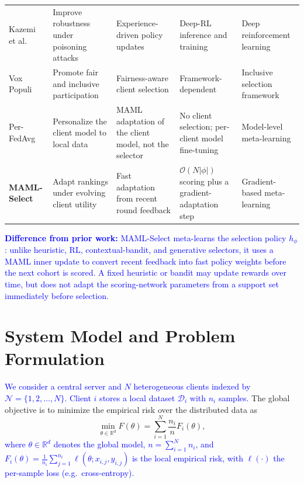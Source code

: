 \documentclass[journal]{IEEEtran}
\newcommand{\revision}[1]{\textcolor{blue}{#1}}
\begin{document}
\begin{table}[!t]
\begin{tabularx}{\textwidth}{lXXXX}
        Kazemi et al.~\cite{kazemi2026robust} & Improve robustness under poisoning attacks & Experience-driven policy updates & Deep-RL inference and training & Deep reinforcement learning \\
        Vox Populi~\cite{arisdakessian2026vox} & Promote fair and inclusive participation & Fairness-aware client selection & Framework-dependent & Inclusive selection framework \\
        Per-FedAvg~\cite{fallah2020personalized} & Personalize the client model to local data & MAML adaptation of the client model, not the selector & No client selection; per-client model fine-tuning & Model-level meta-learning \\
        \textbf{MAML-Select} & Adapt rankings under evolving client utility & Fast adaptation from recent round feedback & $\mathcal{O}(N|\phi|)$ scoring plus a gradient-adaptation step & Gradient-based meta-learning \\
        \bottomrule
    \end{tabularx}
\end{table}

\revision{\textbf{Difference from prior work:} MAML-Select meta-learns the selection policy $h_\phi$: unlike heuristic, RL, contextual-bandit, and generative selectors, it uses a MAML inner update to convert recent feedback into fast policy weights before the next cohort is scored. A fixed heuristic or bandit may update rewards over time, but does not adapt the scoring-network parameters from a support set immediately before selection.}

\section{System Model and Problem Formulation}
\revision{We consider a central server and $N$ heterogeneous clients indexed by $\mathcal{N} = \{1, 2, \ldots, N\}$. Client $i$ stores a local dataset $\mathcal{D}_i$ with $n_i$ samples.} The global objective is to minimize the empirical risk over the distributed data as
\begin{equation}
	\min_{\theta \in \mathbb{R}^d} F(\theta) = \sum_{i=1}^{N} \frac{n_i}{n} F_i(\theta),
	\label{eq:global_objective}
\end{equation}
\revision{where $\theta \in \mathbb{R}^d$ denotes the global model, $n = \sum_{i=1}^{N} n_i$, and $F_i(\theta) = \frac{1}{n_i} \sum_{j=1}^{n_i} \ell(\theta; x_{i,j}, y_{i,j})$ is the local empirical risk, with $\ell(\cdot)$ the per-sample loss (e.g.\ cross-entropy).}
\end{document}

